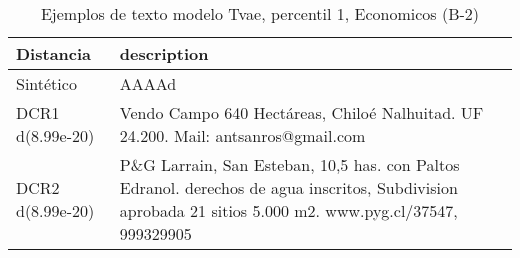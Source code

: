 \begin{table}[H]
\centering
\fontsize{10}{14}\selectfont
\caption{Ejemplos de texto modelo Tvae, percentil 1, Economicos (B-2)}
\label{table-example-economicos-b-2-tvae-1p-text}
\begin{tabular}{|l|m{35em}|}
\hline
\rowcolor[gray]{0.8}
Distancia & description \\
\hline Sintético & AAAAd \\
\hline DCR1 d(8.99e-20) & Vendo Campo 640 Hect\'areas, Chilo\'e Nalhuitad. UF 24.200. Mail: antsanros@gmail.com \\
\hline DCR2 d(8.99e-20) & P\&G Larrain, San Esteban, 10,5 has. con Paltos Edranol. derechos de agua inscritos, Subdivision aprobada 21 sitios 5.000 m2. www.pyg.cl/37547, 999329905 \\
\hline
\end{tabular}
\end{table}
